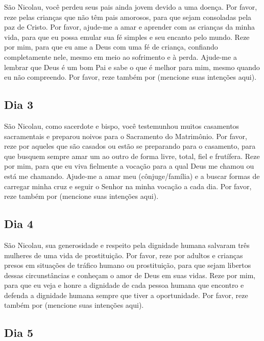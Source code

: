 \documentclass[11pt]{article}
\begin{document}
\textbf{}

São Nicolau, você perdeu seus pais ainda jovem devido a uma doença. Por favor, reze pelas crianças que não têm pais amorosos, para que sejam consoladas pela paz de Cristo. Por favor, ajude-me a amar e aprender com as crianças da minha vida, para que eu possa emular sua fé simples e seu encanto pelo mundo.  
Reze por mim, para que eu ame a Deus com uma fé de criança, confiando completamente nele, mesmo em meio ao sofrimento e à perda. Ajude-me a lembrar que Deus é um bom Pai e sabe o que é melhor para mim, mesmo quando eu não compreendo.  
Por favor, reze também por (mencione suas intenções aqui).  

\vfill

\subsection{Dia 3}

\textbf{}

São Nicolau, como sacerdote e bispo, você testemunhou muitos casamentos sacramentais e preparou noivos para o Sacramento do Matrimônio. Por favor, reze por aqueles que são casados ou estão se preparando para o casamento, para que busquem sempre amar um ao outro de forma livre, total, fiel e frutífera.  
Reze por mim, para que eu viva fielmente a vocação para a qual Deus me chamou ou está me chamando. Ajude-me a amar meu (cônjuge/família) e a buscar formas de carregar minha cruz e seguir o Senhor na minha vocação a cada dia.  
Por favor, reze também por (mencione suas intenções aqui).  

\subsection{Dia 4}

\textbf{}

São Nicolau, sua generosidade e respeito pela dignidade humana salvaram três mulheres de uma vida de prostituição. Por favor, reze por adultos e crianças presos em situações de tráfico humano ou prostituição, para que sejam libertos dessas circunstâncias e conheçam o amor de Deus em suas vidas.  
Reze por mim, para que eu veja e honre a dignidade de cada pessoa humana que encontro e defenda a dignidade humana sempre que tiver a oportunidade.  
Por favor, reze também por (mencione suas intenções aqui).  

\subsection{Dia 5}
\end{document}
